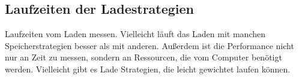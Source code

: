 \subsection{Laufzeiten der Ladestrategien}
Laufzeiten vom Laden messen. Vielleicht läuft das Laden mit manchen Speicherstrategien 
besser als mit anderen. Außerdem ist die Performance nicht nur an Zeit zu messen, sondern
an Ressourcen, die vom Computer benötigt werden. Vielleicht gibt es Lade Strategien, die
leicht gewichtet laufen können.